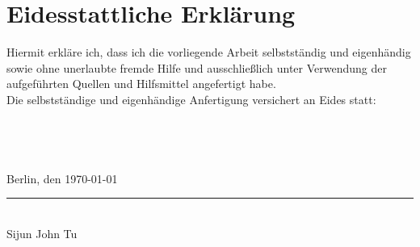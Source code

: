 \thispagestyle{empty}
\section*{Eidesstattliche Erklärung}

Hiermit erkläre ich, dass ich die vorliegende Arbeit selbstständig und eigenhändig sowie ohne unerlaubte fremde Hilfe und ausschließlich unter Verwendung der aufgeführten Quellen und Hilfsmittel angefertigt habe.\\

Die selbstständige und eigenhändige Anfertigung versichert an Eides statt:\\\\\\\\\\
Berlin, den \today \\[5cm]
\rule{10cm}{0.4pt}\\
Sijun John Tu